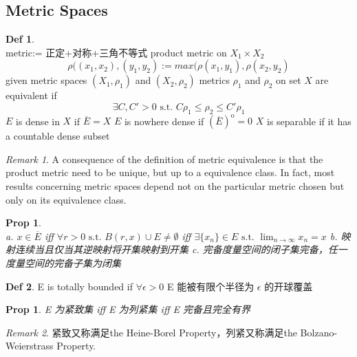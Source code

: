 \documentclass[hidelinks]{article}
\theoremstyle{definition}
\newtheorem*{defin}{Def}
\theoremstyle{plain}
\newtheorem{proposition}[theorem]{Prop}
\theoremstyle{remark}
\newtheorem*{remark}{Remark}
\begin{document}
\subsection{Metric Spaces}
\begin{defin}~\\
metric:= 正定+对称+三角不等式 \newline
product metric on $X_1\times X_2$
$$\rho((x_1, x_2),(y_1, y_2):=max(\rho(x_1,y_1),\rho(x_2,y_2)$$
given metric spaces $(X_1,\rho_1)$ and $(X_2,\rho_2)$ \newline
metrics $\rho_1$ and $\rho_2$ on set $X$ are equivalent if
\[
\exists C,C'>0 \textrm{ s.t. } C\rho_1\leq \rho_2\leq C'\rho_1
\]
$E$ is dense in $X$ if $\overline{E}=X$ \newline
$E$ is nowhere dense if $(\overline{E})^{\mathrm{o}}=0$ \newline
$X$ is separable if it has a countable dense subset
\end{defin}

\begin{remark}
A consequence of the definition of metric equivalence is that the product metric need to be unique, but up to a equivalence class. In fact, most results concerning metric spaces depend not on the particular metric chosen but only on its equivalence class.
\end{remark}

\begin{proposition} \label{Prop 0.10}~\\
a. $x\in \overline{E}$ \textrm{ iff } $\forall r>0 \textrm{ s.t. } B(r,x)\cup E\neq \emptyset$ \textrm{ iff } $\exists \{x_n\}\in E\textrm{ s.t. }\lim_{n\to \infty}x_n=x$ \newline
b. 映射连续当且仅当其逆映射将开集映射到开集 \newline
c. 完备度量空间的闭子集完备，任一度量空间的完备子集为闭集
\end{proposition}

\begin{defin}
E is totally bounded if $\forall \epsilon >0$ E 能被有限个半径为 $\epsilon$ 的开球覆盖
\end{defin}

\begin{proposition} \label{Prop 0.11}
E 为紧致集 \textrm{iff} E 为列紧集 \textrm{iff} E 完备且完全有界
\end{proposition}

\begin{remark}
紧致又称满足the Heine-Borel Property，列紧又称满足the Bolzano-Weierstrass Property.
\end{remark}
\end{document}

